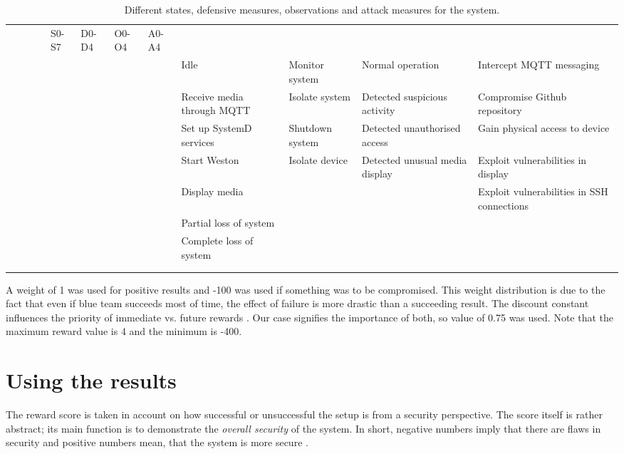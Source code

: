 \begin{landscape}
\begin{table}
\centering
\begin{tabular}{ |c|c|c|c| }
 \hline & & & & S0-S7 & D0-D4 & O0-O4 & A0-A4 \\ & & & & \hline \hline
 & & & & Idle & Monitor system & Normal operation & Intercept MQTT
 messaging \\ & & & & \hline & & & & Receive media through MQTT &
 Isolate system & Detected suspicious activity & Compromise Github
 repository \\ & & & & \hline & & & & Set up SystemD services &
 Shutdown system & Detected unauthorised access & Gain physical access
 to device \\ & & & & \hline & & & & Start Weston & Isolate device &
 Detected unusual media display & Exploit vulnerabilities in display
 \\ & & & & \hline & & & & Display media & & & Exploit vulnerabilities
 in SSH connections \\ & & & & \hline & & & & Partial loss of system &
 \ & \ & \\ & & & & \hline & & & & Complete loss of system & & & \\ &
 & & & \hline & & & & & & & \\ & & & & \hline

\end{tabular}
\caption{Different states, defensive measures, observations and attack
  measures for the system.}
\label{pomdbtable}
\end{table}
\end{landscape}

A weight of 1 was used for positive results and -100 was used if something
was to be compromised. This weight distribution is due to the fact
that even if blue team succeeds most of time, the effect of failure
is more drastic than a succeeding result. The
discount constant influences the priority of immediate
vs. future rewards \cite{mcabeeMarkov}. Our case signifies the
importance of both, so value of 0.75 was used. Note that the maximum
reward value is 4 and the minimum is -400.

\section{Using the results} \label{usingtheresults}

The reward score is taken in account on how
successful or unsuccessful the setup is from a security perspective. The
score itself is rather abstract; its main function is to demonstrate
the \textit{overall security} of the system. In short, negative
numbers imply that there are flaws in security and positive numbers mean,
that the system is more secure
\cite{mcabeeMarkov}.

